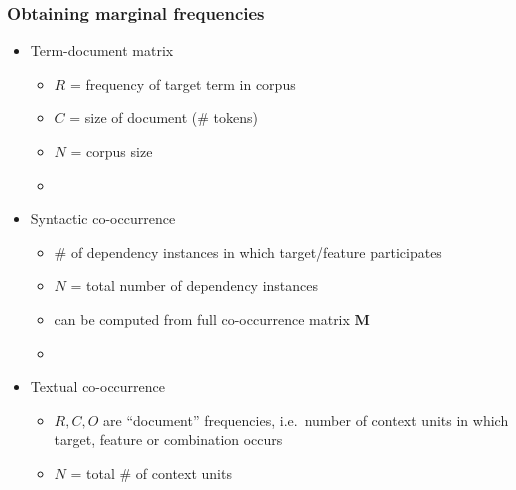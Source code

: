 \documentclass[t]{beamer} %
\begin{document}
\begin{frame}
  \frametitle{Obtaining marginal frequencies}

  \begin{itemize}
  \item Term-document matrix
    \begin{itemize}
    \item $R$ = frequency of target term in corpus
    \item $C$ = size of document (\# tokens)
    \item $N$ = corpus size
    \item[]
    \end{itemize}
  \item<2-> Syntactic co-occurrence
    \begin{itemize}
    \item \# of dependency instances in which target/feature participates
    \item $N$ = total number of dependency instances 
    \item can be computed from full co-occurrence matrix $\mathbf{M}$
    \item[]
    \end{itemize}
  \item<3-> Textual co-occurrence
    \begin{itemize}
    \item $R, C, O$ are ``document'' frequencies, i.e.\ number of context units in which target, feature or combination occurs
    \item $N$ = total \# of context units
    \end{itemize}
  \end{itemize}
\end{frame}
\end{document}
